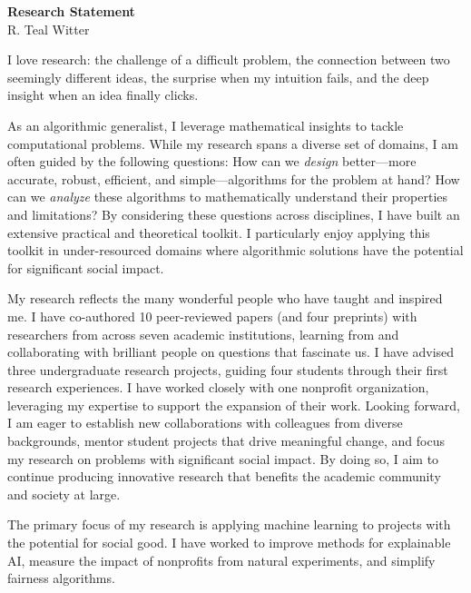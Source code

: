 \documentclass[11pt]{article}
\begin{document}
\begin{center}
	\Large \textbf{Research Statement} \\
	\vspace{.25em}
	\large{R. {\color{teal}Teal} Witter}
\end{center}

I love research: the challenge of a difficult problem, the connection between two seemingly different ideas, the surprise when my intuition fails, and the deep insight when an idea finally clicks.

As an algorithmic generalist, I leverage mathematical insights to tackle computational problems.
While my research spans a diverse set of domains, I am often guided by the following questions:
How can we \textit{design} better---more accurate, robust, efficient, and simple---algorithms for the problem at hand?
How can we \textit{analyze} these algorithms to mathematically understand their properties and limitations?
By considering these questions across disciplines, I have built an extensive practical and theoretical toolkit.
I particularly enjoy applying this toolkit in under-resourced domains where algorithmic solutions have the potential for significant social impact.

My research reflects the many wonderful people who have taught and inspired me.
I have co-authored 10 peer-reviewed papers (and four preprints) with researchers from across seven academic institutions, learning from and collaborating with brilliant people on questions that fascinate us.
I have advised three undergraduate research projects, guiding four students through their first research experiences.
I have worked closely with one nonprofit organization, leveraging my expertise to support the expansion of their work.
Looking forward, I am eager to establish new collaborations with colleagues from diverse backgrounds, mentor student projects that drive meaningful change, and focus my research on problems with significant social impact.
By doing so, I aim to continue producing innovative research that benefits the academic community and society at large.


The primary focus of my research is applying machine learning to projects with the potential for social good.
I have worked to improve methods for explainable AI, measure the impact of nonprofits from natural experiments, and simplify fairness algorithms.
\end{document}
